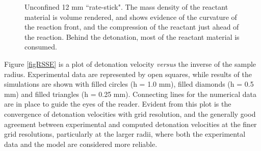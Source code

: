 \begin{figure}
  \center
  \caption{Unconfined 12 mm ``rate-stick".  The mass density of the reactant 
           material is volume rendered, and shows evidence of the curvature 
           of the reaction front, and the compression of the reactant just 
           ahead of the reaction.  Behind the detonation, most of the reactant 
           material is consumed. }
  \label{figRSVR}
\end{figure}

Figure \ref{figRSSE} is  a plot of detonation velocity {\it{versus}} the inverse of 
the sample radius.  Experimental data are represented by open squares, 
while results of the simulations are shown with filled circles (h = 1.0 mm), filled
diamonds (h = 0.5 mm) and filled triangles (h = 0.25 mm).  Connecting lines for 
the numerical data are in place to guide the eyes of the reader.  Evident 
from this plot is the convergence of detonation velocities with grid 
resolution, and the generally good agreement between experimental and
computed detonation velocities at the finer grid resolutions, particularly 
at the larger radii, where both the experimental data and the model are 
considered more reliable.


